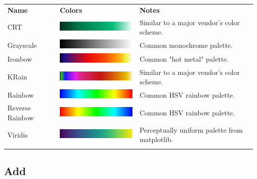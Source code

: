 \begin{tabularx}{16cm}{llX}
\thickhline
\textbf{Name} & \textbf{Colors} & \textbf{Notes} \\
\thickhline
CRT & \includegraphics[width=5cm]{images/eye-gradient-crt.png} & Similar to a major vendor's color scheme.\\
Grayscale & \includegraphics[width=5cm]{images/eye-gradient-grayscale.png} & Common monochrome palette.\\
Ironbow & \includegraphics[width=5cm]{images/eye-gradient-ironbow.png} & Common "hot metal" palette. \\
KRain & \includegraphics[width=5cm]{images/eye-gradient-krain.png} & Similar to a major vendor's color scheme.\\
Rainbow & \includegraphics[width=5cm]{images/eye-gradient-rainbow.png} & Common HSV rainbow palette. \\
Reverse Rainbow & \includegraphics[width=5cm]{images/eye-gradient-reverse-rainbow.png} & Common HSV rainbow palette. \\
Viridis & \includegraphics[width=5cm]{images/eye-gradient-viridis.png} & Perceptually uniform palette from matplotlib. \\
\thickhline
\end{tabularx}

\subsection{Add}

